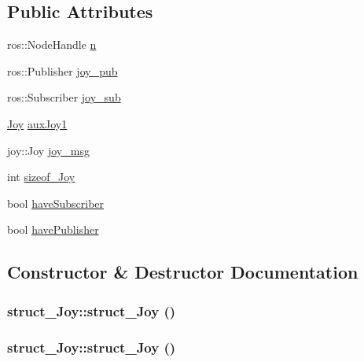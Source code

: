 \subsection*{Public Attributes}
\begin{DoxyCompactItemize}
\item 
ros::NodeHandle \hyperlink{classstruct__Joy_afc0b4423d122753e49a142768882b458}{n}
\item 
ros::Publisher \hyperlink{classstruct__Joy_ae2f0324335e5f6692d1e398c80c84979}{joy\_\-pub}
\item 
ros::Subscriber \hyperlink{classstruct__Joy_ae01b03fd078106377cefb61eed252fde}{joy\_\-sub}
\item 
\hyperlink{structJoy}{Joy} \hyperlink{classstruct__Joy_a53d67349adb0afbdc4d30eead0903f21}{auxJoy1}
\item 
joy::Joy \hyperlink{classstruct__Joy_a1abf576689f865066505c7d3931cf175}{joy\_\-msg}
\item 
int \hyperlink{classstruct__Joy_a85b0158996d7206a23bf7012ceb23f9e}{sizeof\_\-Joy}
\item 
bool \hyperlink{classstruct__Joy_a350d227f222fa989e455d9ca0f28e106}{haveSubscriber}
\item 
bool \hyperlink{classstruct__Joy_a766b261da0d33afd7a1b0319be93b0cb}{havePublisher}
\end{DoxyCompactItemize}


\subsection{Constructor \& Destructor Documentation}
\hypertarget{classstruct__Joy_acd6825fe6adb60efa565e5ee22450255}{
\subsubsection[{struct\_\-Joy}]{\setlength{\rightskip}{0pt plus 5cm}struct\_\-Joy::struct\_\-Joy ()}}
\label{classstruct__Joy_acd6825fe6adb60efa565e5ee22450255}
\hypertarget{classstruct__Joy_acd6825fe6adb60efa565e5ee22450255}{
\subsubsection[{struct\_\-Joy}]{\setlength{\rightskip}{0pt plus 5cm}struct\_\-Joy::struct\_\-Joy ()}}
\label{classstruct__Joy_acd6825fe6adb60efa565e5ee22450255}


